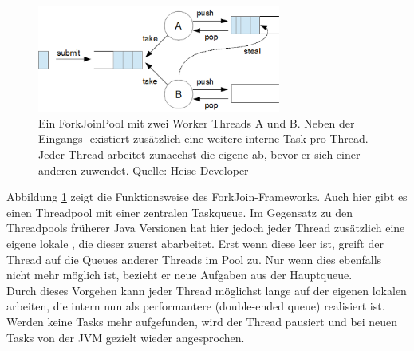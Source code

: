 \documentclass[times, 10pt,twocolumn]{article}
\begin{document}
\begin{figure}[h!]
\includegraphics[width=8cm]{../images/forkjoin.png}
\caption[Fork/Join Image.]{Ein ForkJoinPool mit zwei Worker Threads A und B. Neben der Eingangs- existiert zusätzlich eine weitere interne Task  pro Thread. Jeder Thread arbeitet zunaechst die eigene  ab, bevor er sich einer anderen zuwendet. Quelle: Heise Developer\cite{forkjoinheise}}
\label{forkjoinpic}
\end{figure}

Abbildung \ref{forkjoinpic} zeigt die Funktionsweise des ForkJoin-Frameworks. Auch hier gibt es einen Threadpool mit einer zentralen Taskqueue. Im Gegensatz zu den Threadpools früherer Java Versionen hat hier jedoch jeder Thread zusätzlich eine eigene lokale , die dieser zuerst abarbeitet. Erst wenn diese leer ist, greift der Thread auf die Queues anderer Threads im Pool zu. Nur wenn dies ebenfalls nicht mehr möglich ist, bezieht er neue Aufgaben aus der Hauptqueue.\\

Durch dieses Vorgehen kann jeder Thread möglichst lange auf der eigenen lokalen  arbeiten, die intern nun als performantere  (double-ended queue) realisiert ist. Werden keine Tasks mehr aufgefunden, wird der Thread pausiert und bei neuen Tasks von der JVM gezielt wieder angesprochen.\cite{forkjoinheise}\\



\vfill
{}
\jDocIndex
\end{document}
